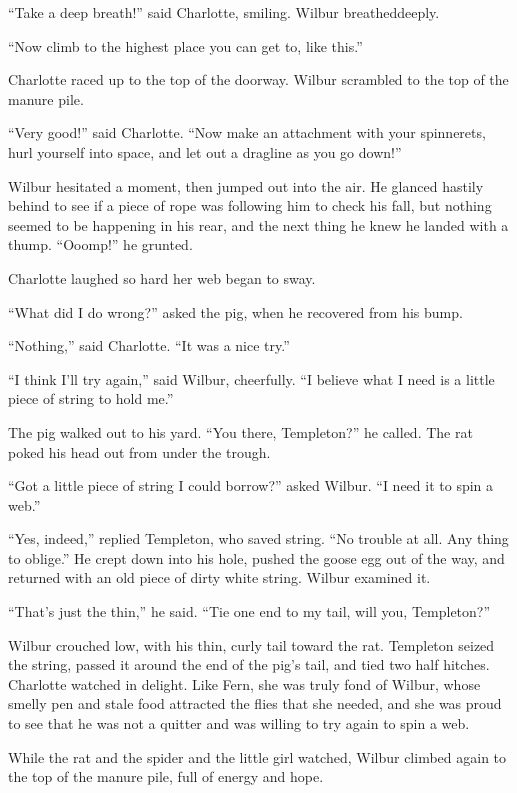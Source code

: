 \documentclass[a4paper, oneside]{book}
\begin{document}
``Take a deep breath!'' said Charlotte, smiling. Wilbur breatheddeeply.

``Now climb to the highest place you can get to, like this.''

Charlotte raced up to the top of the doorway. Wilbur scrambled to the top of the manure pile.

``Very good!'' said Charlotte. ``Now make an attachment with your
spinnerets, hurl yourself into space, and let out a dragline as you go
down!''

Wilbur hesitated a moment, then jumped out into the air. He
glanced hastily behind to see if a piece of rope was following him to
check his fall, but nothing seemed to be happening in his rear, and
the next thing he knew he landed with a thump. ``Ooomp!'' he
grunted.

 Charlotte laughed so hard her web began to sway. 

 ``What did I do wrong?'' asked the pig, when he recovered from
his bump.

 ``Nothing,'' said Charlotte. ``It was a nice try.'' 

 ``I think I’ll try again,'' said Wilbur, cheerfully. ``I believe what I
need is a little piece of string to hold me.''

 The pig walked out to his yard. ``You there, Templeton?'' he
called. The rat poked his head out from under the trough. 

``Got a little piece of string I could borrow?'' asked Wilbur. ``I
need it to spin a web.''

 ``Yes, indeed,'' replied Templeton, who saved string. ``No
trouble at all. Any thing to oblige.'' He crept down into his hole,
pushed the goose egg out of the way, and returned with an old
piece of dirty white string. Wilbur examined it.

 ``That’s just the thin,'' he said. ``Tie one end to my tail, will you,
Templeton?''

Wilbur crouched low, with his thin, curly tail toward the rat.
Templeton seized the string, passed it around the end of the pig's
tail, and tied two half hitches. Charlotte watched in delight. Like
Fern, she was truly fond of Wilbur, whose smelly pen and stale
food attracted the flies that she needed, and she was proud to see
that he was not a quitter and was willing to try again to spin a web.

 While the rat and the spider and the little girl watched, Wilbur
climbed again to the top of the manure pile, full of energy and hope. 
\end{document}
